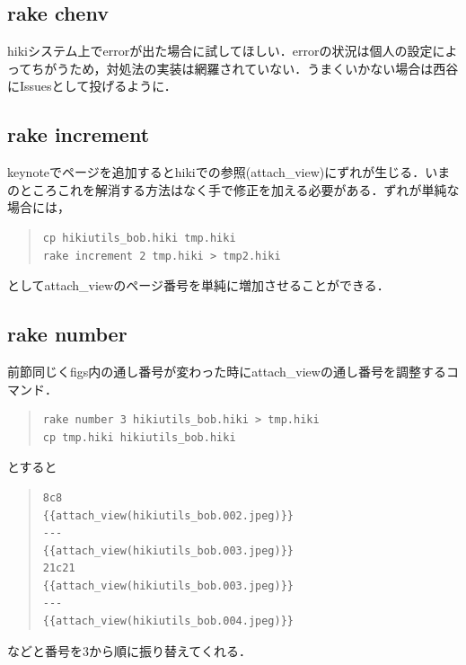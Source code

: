 \documentclass[12pt,a4paper]{jsarticle}
\begin{document}
\subsection{rake chenv}
hikiシステム上でerrorが出た場合に試してほしい．errorの状況は個人の設定によってちがうため，対処法の実装は網羅されていない．うまくいかない場合は西谷にIssuesとして投げるように．

\subsection{rake increment}
keynoteでページを追加するとhikiでの参照(attach\_view)にずれが生じる．いまのところこれを解消する方法はなく手で修正を加える必要がある．ずれが単純な場合には，
\begin{quote}\begin{verbatim}
cp hikiutils_bob.hiki tmp.hiki
rake increment 2 tmp.hiki > tmp2.hiki
\end{verbatim}\end{quote}
としてattach\_viewのページ番号を単純に増加させることができる．

\subsection{rake number}
前節同じくfigs内の通し番号が変わった時にattach\_viewの通し番号を調整するコマンド．
\begin{quote}\begin{verbatim}
rake number 3 hikiutils_bob.hiki > tmp.hiki
cp tmp.hiki hikiutils_bob.hiki
\end{verbatim}\end{quote}
とすると
\begin{quote}\begin{verbatim}
8c8
{{attach_view(hikiutils_bob.002.jpeg)}}
---
{{attach_view(hikiutils_bob.003.jpeg)}}
21c21
{{attach_view(hikiutils_bob.003.jpeg)}}
---
{{attach_view(hikiutils_bob.004.jpeg)}}
\end{verbatim}\end{quote}
などと番号を3から順に振り替えてくれる．
\end{document}
